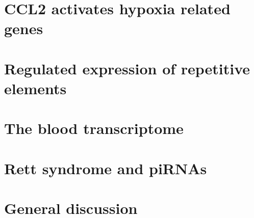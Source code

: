 \documentclass[12pt,a4paper]{report}
\begin{document}
\chapter{CCL2 activates hypoxia related genes}


\chapter{Regulated expression of repetitive elements}


\chapter{The blood transcriptome}


\chapter{Rett syndrome and piRNAs}



%

\chapter{General discussion}




\end{document}
